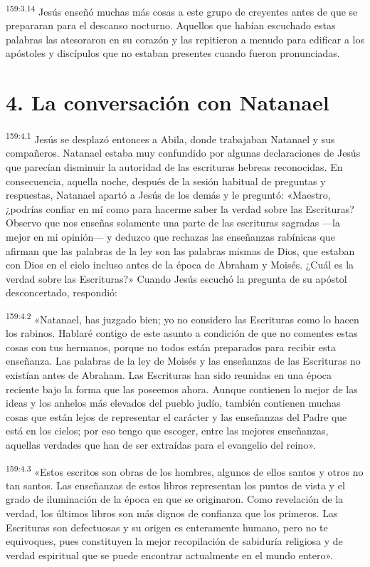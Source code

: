 \par 
\textsuperscript{159:3.14} Jesús enseñó muchas más cosas a este grupo de creyentes antes de que se prepararan para el descanso nocturno. Aquellos que habían escuchado estas palabras las atesoraron en su corazón y las repitieron a menudo para edificar a los apóstoles y discípulos que no estaban presentes cuando fueron pronunciadas.

\section*{4. La conversación con Natanael}
\par 
\textsuperscript{159:4.1} Jesús se desplazó entonces a Abila, donde trabajaban Natanael y sus compañeros. Natanael estaba muy confundido por algunas declaraciones de Jesús que parecían disminuir la autoridad de las escrituras hebreas reconocidas. En consecuencia, aquella noche, después de la sesión habitual de preguntas y respuestas, Natanael apartó a Jesús de los demás y le preguntó: «Maestro, ¿podrías confiar en mí como para hacerme saber la verdad sobre las Escrituras? Observo que nos enseñas solamente una parte de las escrituras sagradas ---la mejor en mi opinión--- y deduzco que rechazas las enseñanzas rabínicas que afirman que las palabras de la ley son las palabras mismas de Dios, que estaban con Dios en el cielo incluso antes de la época de Abraham y Moisés. ¿Cuál es la verdad sobre las Escrituras?» Cuando Jesús escuchó la pregunta de su apóstol desconcertado, respondió:

\par 
\textsuperscript{159:4.2} «Natanael, has juzgado bien; yo no considero las Escrituras como lo hacen los rabinos. Hablaré contigo de este asunto a condición de que no comentes estas cosas con tus hermanos, porque no todos están preparados para recibir esta enseñanza. Las palabras de la ley de Moisés y las enseñanzas de las Escrituras no existían antes de Abraham. Las Escrituras han sido reunidas en una época reciente bajo la forma que las poseemos ahora. Aunque contienen lo mejor de las ideas y los anhelos más elevados del pueblo judío, también contienen muchas cosas que están lejos de representar el carácter y las enseñanzas del Padre que está en los cielos; por eso tengo que escoger, entre las mejores enseñanzas, aquellas verdades que han de ser extraídas para el evangelio del reino».

\par 
\textsuperscript{159:4.3} «Estos escritos son obras de los hombres, algunos de ellos santos y otros no tan santos. Las enseñanzas de estos libros representan los puntos de vista y el grado de iluminación de la época en que se originaron. Como revelación de la verdad, los últimos libros son más dignos de confianza que los primeros. Las Escrituras son defectuosas y su origen es enteramente humano, pero no te equivoques, pues constituyen la mejor recopilación de sabiduría religiosa y de verdad espiritual que se puede encontrar actualmente en el mundo entero».

